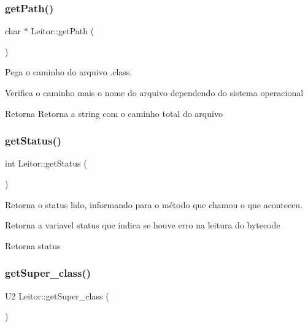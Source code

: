\subsubsection{\texorpdfstring{get\+Path()}{getPath()}}
{\footnotesize\ttfamily char $\ast$ Leitor\+::get\+Path (\begin{DoxyParamCaption}{ }\end{DoxyParamCaption})}



Pega o caminho do arquivo .class. 

Verifica o caminho mais o nome do arquivo dependendo do sistema operacional \begin{DoxyReturn}{Retorna}
Retorna a string com o caminho total do arquivo 
\end{DoxyReturn}
\mbox{\label{classLeitor_a55c4c9df6771ce70388001a064f28256}} 
\subsubsection{\texorpdfstring{get\+Status()}{getStatus()}}
{\footnotesize\ttfamily int Leitor\+::get\+Status (\begin{DoxyParamCaption}{ }\end{DoxyParamCaption})}



Retorna o status lido, informando para o método que chamou o que aconteceu. 

Retorna a variavel status que indica se houve erro na leitura do bytecode \begin{DoxyReturn}{Retorna}
status 
\end{DoxyReturn}
\mbox{\label{classLeitor_ab70e078103dc971808b62ab08cbfb4fa}} 
\subsubsection{\texorpdfstring{get\+Super\+\_\+class()}{getSuper\_class()}}
{\footnotesize\ttfamily U2 Leitor\+::get\+Super\+\_\+class (\begin{DoxyParamCaption}{ }\end{DoxyParamCaption})}



